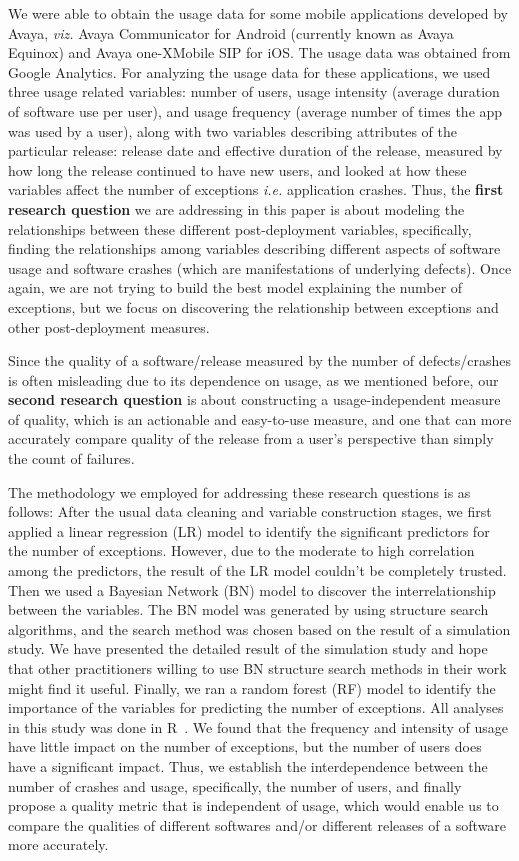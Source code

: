 \documentclass[smallcondensed]{svjour3}     %
\begin{document}
We were able to obtain the usage data for some mobile applications developed by Avaya, \textit{viz.}  Avaya Communicator for Android (currently known as Avaya Equinox\textregistered) and Avaya one-X\textregistered  Mobile SIP for iOS. The usage data was obtained from Google Analytics. 
For analyzing the usage data for these applications, we used three usage related variables: number of users, 
usage intensity (average duration of software use per user), and usage frequency 
(average number of times the app was used by a user), along with two variables describing attributes 
of the particular release: release date and effective duration of the release, measured by how 
long the release continued to have new users, and looked at how these variables affect 
the number of exceptions \textit{i.e.} application crashes.  Thus, the \textbf{first research question} we are addressing in this paper is about modeling the relationships between these different post-deployment variables, specifically, finding the relationships among variables describing different aspects of software
usage and software crashes (which are manifestations of underlying defects). Once again, we are not trying to build the best model explaining the number of exceptions, but we focus on discovering the relationship between exceptions and other post-deployment measures.

Since the quality of a software/release measured by the number of defects/crashes is often misleading due to its dependence on usage, as we mentioned before, our \textbf{second research question} is about constructing a usage-independent measure of quality, which is  an actionable and easy-to-use measure, and one that can more accurately compare quality of the release from a user’s perspective than simply the count of failures.


The methodology we employed for addressing these research questions is as follows: After the usual data cleaning and variable construction stages, we first applied a linear regression (LR) model to identify the significant predictors for the number of exceptions. However, due to the moderate to high correlation among the predictors, the result of the LR model couldn't be completely trusted. Then we used a Bayesian Network (BN) model to discover the interrelationship between the variables. The BN model was generated by using structure search algorithms, and the search method was chosen based on the result of a simulation study. We have presented the detailed result of the simulation study and hope that other practitioners willing to use BN structure search methods in their work might find it useful.  Finally, we ran a random forest (RF) model to identify the importance of the variables for predicting the number of exceptions. All analyses in this study was done in R~\cite{R}. We found that the frequency and intensity of usage have little impact on the number of exceptions, but the number of users does have a significant impact. Thus, we establish the interdependence between the number of crashes and usage, specifically, the number of users, and finally propose a quality metric that is independent of usage, which would enable us to compare the qualities of different softwares and/or different releases of a software more accurately. 
\end{document}
